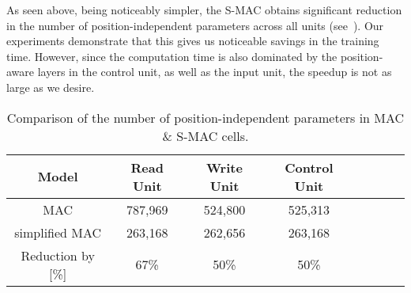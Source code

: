 As seen above, being noticeably simpler, the S-MAC obtains significant reduction in the number of position-independent parameters across all units (see~).
Our experiments demonstrate that this gives us noticeable savings in the training time. However, since the computation time is also dominated by the position-aware layers in the control unit, as well as the input unit, the speedup is not as large as we desire.


\begin{table}[!t]
	\centering
	\begin{tabular}{ccccCcCc}
		\toprule
		Model        & Read Unit               & Write Unit &  Control Unit         \\
		\midrule
		MAC   &  787,969 &  524,800        &    525,313    \\
		simplified MAC & 263,168  & 262,656       &    263,168 \\
		\midrule
		Reduction by [\%]  & 67\%  &   50\%       &      50\%  \\
		\bottomrule
	\end{tabular}
	\caption{Comparison of the number of position-independent parameters in MAC \& S-MAC cells.}
	\label{tab:parameters}
\end{table}

